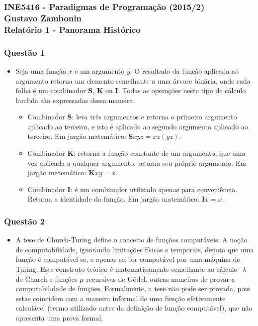 \documentclass{article}
\begin{document}
\subsubsection*{INE5416 - Paradigmas de Programação (2015/2) \\
    Gustavo Zambonin \\
    Relatório 1 - Panorama Histórico
}

\subsubsection*{Questão 1}
\begin{itemize}
    \item Seja uma função $x$ e um argumento $y$. O resultado da função aplicada
    ao argumento retorna um elemento semelhante a uma árvore binária, onde cada
    folha é um combinador \textbf{S}, \textbf{K} ou \textbf{I}. Todas as
    operações neste tipo de cálculo lambda são expressadas dessa maneira.

    \begin{itemize}
        \item Combinador \textbf{S}: leva três argumentos e retorna o primeiro
        argumento aplicado ao terceiro, e isto é aplicado ao segundo argumento
        aplicado ao terceiro. Em jargão matemático: $\textbf{S}xyz = xz(yz)$.

        \item Combinador \textbf{K}: retorna a função constante de um argumento,
        que uma vez aplicada a qualquer argumento, retorna seu próprio
        argumento. Em jargão matemático: $\textbf{K}xy = x$.

        \item Combinador \textbf{I}: é um combinador utilizado apenas para
        conveniência. Retorna a identidade da função. Em jargão matemático:
        $\textbf{I}x = x$.
    \end{itemize}
\end{itemize}

\subsubsection*{Questão 2}
\begin{itemize}
    \item A tese de Church-Turing define o conceito de funções computáveis. A
    noção de computabilidade, ignorando limitações físicas e temporais, denota
    que uma função é computável se, e apenas se, for computável por uma máquina
    de Turing. Este construto teórico é matematicamente semelhante ao cálculo-
    $\lambda$ de Church e funções $\mu$-recursivas de Gödel, outras maneiras de
    provar a computabilidade de funções. Formalmente, a tese não pode ser
    provada, pois estas coincidem com a maneira informal de uma função
    efetivamente calculável (termo utilizado antes da definição de função
    computável), que não apresenta uma prova formal.
\end{itemize}
\end{document}

